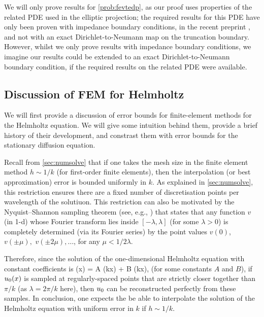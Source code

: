 We will only prove results for \cref{prob:fevtedp}, as our proof uses properties of the related PDE used in the elliptic projection; the required results for this PDE have only been proven with impedance boundary conditions, in the recent preprint \cite{ChNiTo:18}, and not with an exact Dirichlet-to-Neumann map on the truncation boundary. However, whilst we only prove results with impedance boundary conditions, we imagine our results could be extended to an exact Dirichlet-to-Neumann boundary condition, if the required results on the related PDE were available.

\subsection{Discussion of FEM for Helmholtz}\label{sec:helmfedisc}

We will first provide a discussion of error bounds for finite-element methods for the Helmholtz equation. We will give some intuition behind them, provide a brief history of their development, and constrast them with error bounds for the stationary diffusion equation.

Recall from \cref{sec:numsolve} that if one takes the mesh size in the finite element method $h \sim 1/k$ (for first-order finite elements), then the interpolation (or best approximation) error is bounded uniformly in $k$. As explained in \cref{sec:numsolve}, this restriction ensures there are a fixed number of discretisation points per wavelength of the solutiuon. This restriction can also be motivated by the Nyquist--Shannon sampling theorem (see, e.g., \cite[\S 5.21]{BaNaBe:00}) that states that any function $v$ (in 1-d) whose Fourier transform lies inside $[-\lambda,\lambda]$ (for some $\lambda >0$) is completely determined (via its Fourier series) by the point values $v(0)$, $v(\pm \mu),$ $v(\pm2\mu),  \ldots$, for any $\mu < 1/2\lambda.$

Therefore, since the solution of the one-dimensional Helmholtz equation with constant coefficients is
\beq\label{eq:hh-1d}
\uz(x) = A \sin(kx) + B \cos(kx),
\eeq
(for some constants $A$ and $B$), if $u_{0}(x)$ is sampled at regularly-spaced points that are strictly closer together than $\pi/k$ (as $\lambda = 2\pi/k$ here), then $u_{0}$ can be reconstructed perfectly from these samples. In conclusion, one expects the be able to interpolate the solution of the Helmholtz equation with uniform error in $k$ if $h \sim 1/k.$

